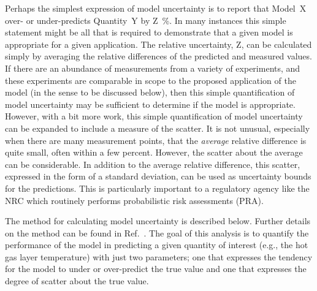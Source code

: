 \documentclass[fleqn,b5paper]{article}
\begin{document}
Perhaps the simplest expression of model uncertainty is to report that Model~X over- or under-predicts Quantity~Y by Z~\%. In many instances this simple statement might be all that is required to demonstrate that a given model is appropriate for a given application. The relative uncertainty, Z, can be calculated simply by averaging the relative differences of the predicted and measured values. If there are an abundance of measurements from a variety of experiments, and these experiments are comparable in scope to the proposed application of the model (in the sense to be discussed below), then this simple quantification of model uncertainty may be sufficient to determine if the model is appropriate. However, with a bit more work, this simple quantification of model uncertainty can be expanded to include a measure of the scatter. It is not unusual, especially when there are many measurement points, that the {\em average} relative difference is quite small, often within a few percent. However, the scatter about the average can be considerable. In addition to the average relative difference, this scatter, expressed in the form of a standard deviation, can be used as uncertainty bounds for the predictions. This is particularly important to a regulatory agency like the NRC which routinely performs probabilistic risk assessments (PRA).

The method for calculating model uncertainty is described below. Further details on the method can be found in Ref.~\cite{McGrattan:Metrologia}. The goal of this analysis is to quantify the performance of the model in predicting a given quantity of interest (e.g., the hot gas layer temperature) with just two parameters; one that expresses the tendency for the model to under or over-predict the true value and one that expresses the degree of scatter about the true value.
\end{document}
